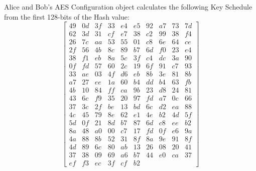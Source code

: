 \documentclass[journal]{IEEEtran}
\begin{document}
Alice and Bob's AES Configuration object calculates the following Key Schedule from the first 128-bits of the Hash value:
$$
\begin{bmatrix}
49 & 0d & 3f & 33 & e4 & e5 & 92 & a7 & 73 & 7d \\
62 & 3d & 31 & cf & e7 & 38 & c2 & 99 & 38 & f4 \\
26 & 7c & aa & 53 & 55 & 01 & c8 & 6e & 64 & ce \\
2f & 56 & 4b & 8c & 89 & b7 & 6d & f0 & 23 & e4 \\
38 & f1 & eb & 8a & 5c & 3f & c4 & dc & 3a & 90 \\
0f & fd & 57 & 60 & 2c & 19 & 6f & 91 & c7 & 93 \\
33 & ae & 03 & 4f & d6 & eb & 8b & 3e & 81 & 8b \\
a7 & 27 & ee & 1a & 60 & b4 & dd & b4 & 63 & fb \\
4b & 10 & 84 & ff & ca & 9b & 23 & d8 & 24 & 81 \\
43 & 6c & f9 & 35 & 20 & 97 & fd & a7 & 0c & 66 \\
37 & 3c & 2f & be & 13 & bd & 6c & d2 & ea & 88 \\
4c & 45 & 79 & 8e & 62 & e1 & 4e & b2 & 4d & 5f \\
5d & 0f & 21 & 8d & b7 & 87 & 6d & c8 & ee & b2 \\
8a & 48 & a0 & 00 & c7 & 17 & fd & 0f & e6 & 9a \\
4a & 88 & 8b & 52 & 31 & 8f & 8a & 9e & 91 & 8f \\
4d & 89 & 6c & 80 & ab & 13 & 26 & 08 & 20 & 41 \\
37 & 38 & 09 & 69 & a6 & b7 & 44 & e0 & ca & 37 \\
ef & f3 & ec & 3f & cf & b2
\end{bmatrix}
$$
\end{document}
